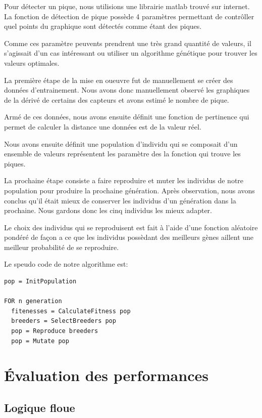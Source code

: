 \documentclass[12pt,letterpaper]{article}
\begin{document}
Pour détecter un pique, nous utilisions une librairie matlab trouvé sur internet. La fonction de détection de pique
possède 4 paramètres permettant de contrôller quel points du graphique sont détectés comme étant des piques. 

Comme ces paramètre peuvents prendrent une très grand quantité de valeurs, il s'agissait d'un cas intéressant ou utiliser
un algorithme génétique pour trouver les valeurs optimales. 

La première étape de la mise en oueuvre fut de manuellement se créer des données d'entrainement. Nous avons donc manuellement
observé les graphiques de la dérivé de certains des capteurs et avons estimé le nombre de pique. 

Armé de ces données, nous avons ensuite définit une fonction de pertinence qui permet de calculer la distance une données est de 
la valeur réel. 

Nous avons ensuite définit une population d'individu qui se composait d'un ensemble de valeurs représentent les paramètre des la
fonction qui trouve les piques. 

La prochaine étape consiste a faire reproduire et muter les individus de notre population pour produire la prochaine génération. Après 
observation, nous avons conclus qu'il était mieux de conserver les individus d'un génération dans la prochaine. Nous gardons donc les 
cinq individus les mieux adapter. 

Le choix des individus qui se reproduisent est fait à l'aide d'une fonction aléatoire pondéré de façon a ce que les individus possèdant
des meilleurs gènes aillent une meilleur probabilité de se reproduire. 

Le speudo code de notre algorithme est:

\begin{verbatim}
pop = InitPopulation

FOR n generation
  fitenesses = CalculateFitness pop
  breeders = SelectBreeders pop
  pop = Reproduce breeders
  pop = Mutate pop

\end{verbatim}


\section{Évaluation des performances}

\subsection{Logique floue}
\end{document}
